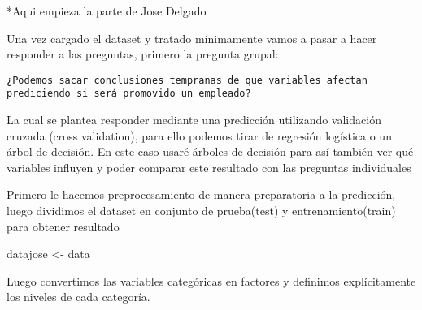 \documentclass[
]{article}
\newenvironment{Shaded}{\begin{snugshade}}{\end{snugshade}}
\newcommand{\NormalTok}[1]{#1}
\newcommand{\OtherTok}[1]{\textcolor[rgb]{0.56,0.35,0.01}{#1}}
\begin{document}
*Aqui empieza la parte de Jose Delgado

Una vez cargado el dataset y tratado mínimamente vamos a pasar a hacer
responder a las preguntas, primero la pregunta grupal:

\begin{verbatim}
¿Podemos sacar conclusiones tempranas de que variables afectan prediciendo si será promovido un empleado?
\end{verbatim}

La cual se plantea responder mediante una predicción utilizando
validación cruzada (cross validation), para ello podemos tirar de
regresión logística o un árbol de decisión. En este caso usaré árboles
de decisión para así también ver qué variables influyen y poder comparar
este resultado con las preguntas individuales

Primero le hacemos preprocesamiento de manera preparatoria a la
predicción, luego dividimos el dataset en conjunto de prueba(test) y
entrenamiento(train) para obtener resultado

\begin{Shaded}
\begin{Highlighting}[]
\NormalTok{datajose }\OtherTok{\textless{}{-}}\NormalTok{ data}
\end{Highlighting}
\end{Shaded}

Luego convertimos las variables categóricas en factores y definimos
explícitamente los niveles de cada categoría.
\end{document}

